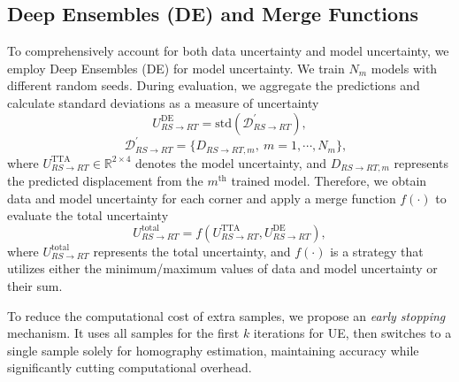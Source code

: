 \subsection{Deep Ensembles (DE) and Merge Functions} To comprehensively account for both data uncertainty and model uncertainty, we employ Deep Ensembles (DE) for model uncertainty. We train $N_m$ models with different random seeds. During evaluation, we aggregate the predictions and calculate standard deviations as a measure of uncertainty
\begin{equation}
     U^\textrm{DE}_{RS\rightarrow RT} = \textrm{std}(\mathcal{D}^\prime_{RS\rightarrow RT}), 
     \end{equation}
     \begin{equation}\quad\mathcal{D}^\prime_{RS\rightarrow RT} = \{D_{RS\rightarrow RT,m},~m=1,\cdots,N_m\},
\end{equation}
where $U^\textrm{TTA}_{RS\rightarrow RT}\in \mathbb{R}^{2\times4}$ denotes the model uncertainty, and $D_{RS\rightarrow RT,m}$ represents the predicted displacement from the $m^\text{th}$ trained model. Therefore, we obtain data and model uncertainty for each corner and apply a merge function $f(\cdot)$ to evaluate the total uncertainty
\begin{equation}
     U^\textrm{total}_{RS\rightarrow RT} = f(U^\textrm{TTA}_{RS\rightarrow RT}, U^\textrm{DE}_{RS\rightarrow RT}),
\end{equation}
where $U^\textrm{total}_{RS\rightarrow RT}$ represents the total uncertainty, and $f(\cdot)$ is a strategy that utilizes either the minimum/maximum values of data and model uncertainty or their sum. 

To reduce the computational cost of extra samples, we propose an \textit{early stopping} mechanism. It uses all samples for the first $k$ iterations for UE, then switches to a single sample solely for homography estimation, maintaining accuracy while significantly cutting computational overhead.


